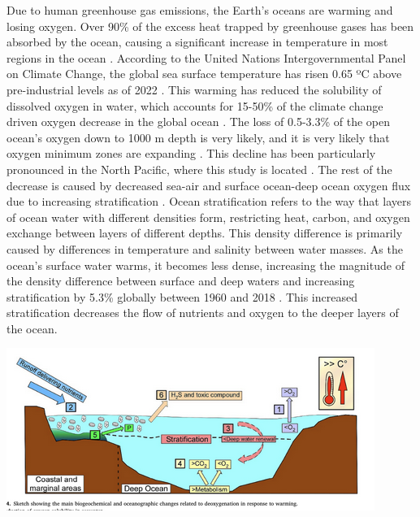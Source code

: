 \documentclass[12pt,twoside]{reedthesis}
\begin{document}
Due to human greenhouse gas emissions, the Earth's oceans are warming and losing oxygen. Over 90\% of the excess heat trapped by greenhouse gases has been absorbed by the ocean, causing a significant increase in temperature in most regions in the ocean \autocite{Bindoff2013}. According to the United Nations Intergovernmental Panel on Climate Change, the global sea surface temperature has risen 0.65 ºC above pre-industrial levels as of 2022 \autocite{Portner2019}. This warming has reduced the solubility of dissolved oxygen in water, which accounts for 15-50\% of the climate change driven oxygen decrease in the global ocean \autocite{Helm2011, Ito2017, Schmidtko2017}. The loss of 0.5-3.3\% of the open ocean's oxygen down to 1000 m depth is very likely, and it is very likely that oxygen minimum zones are expanding \autocite{Bindoff2013}. This decline has been particularly pronounced in the North Pacific, where this study is located \autocite{Bindoff2013, Ito2017}. The rest of the decrease is caused by decreased sea-air and surface ocean-deep ocean oxygen flux due to increasing stratification \autocite{Barth2024, Mancini2024, Portner2019}. Ocean stratification refers to the way that layers of ocean water with different densities form, restricting heat, carbon, and oxygen exchange between layers of different depths. This density difference is primarily caused by differences in temperature and salinity between water masses. As the ocean's surface water warms, it becomes less dense, increasing the magnitude of the density difference between surface and deep waters and increasing stratification by 5.3\% globally between 1960 and 2018 \autocite{Li2020a}. This increased stratification decreases the flow of nutrients and oxygen to the deeper layers of the ocean. 

\includegraphics{Fig_Mancini_Deoxygenation}
\end{document}
